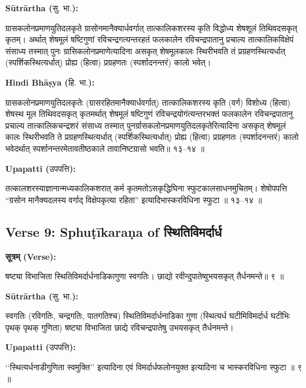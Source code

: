 \documentclass[11pt,a4paper]{article}
\newcommand{\dev}[1]{{\devanagarifont #1}}
\newcommand{\arth}{\textbf{Sūtrārtha (}\dev{सु. भा.}\textbf{):}\ }
\newcommand{\hindi}{\textbf{Hindi Bhāṣya (}\dev{हि. भा.}\textbf{):}\ }
\newcommand{\upapatti}{\textbf{Upapatti (}\dev{उपपत्ति}\textbf{):}\ }
\newenvironment{sanskritverse}{%
  \begin{center}\begin{minipage}{0.9\textwidth}
  \setlength{\leftskip}{1em}
  \setlength{\rightskip}{1em}
  \dev
}{\end{minipage}\end{center}}
\begin{document}
\noindent\arth
\begin{sanskritverse}
ग्रासकलोनप्रमाणयुतिदलकृते ग्रासोनमानैक्यार्धवर्गात् तात्कालिकशरस्य कृति विद्धोध्य
शेषशूलं तिथिवदसकृत् कृतम्। अर्थात् शेषमूलं षष्टिगुणां रविचन्द्रगत्यन्तरहतं फलकालेन
रविचन्द्रपातानु प्रचाल्य तात्कालिकविक्षेपं संसाध्य तस्मात् पुनः ग्रासिकलोनप्रमाणेत्यादिना
असकृत् शेषमूलकालः स्थिरीभवति तं प्रग्रहणस्थित्यर्धात् (स्पर्शिकस्थित्यर्धात्) प्रोह्य
(हित्वा) प्रग्रहणतः (स्पर्शादनन्तरं) कालो भवेत्।
\end{sanskritverse}

\noindent\hindi
\begin{sanskritverse}
ग्रासकलोनप्रमाणयुतिदलकृतेः (ग्रासरहितमानैक्यार्धवर्गात्) तात्कालिकशरस्य कृति
(वर्ग) विशोध्य (हित्वा) शेषस्थ मूल तिथिवदसकृत् कृतमर्थात् शेषमूलं षष्टिगुणं
रविचन्द्रयोगंत्यन्तरभक्तं फलकालेन रविचन्द्रपातानु प्रचाल्य तात्कालिकचन्द्रशरं संसाध्य
तस्मात् पुनर्ग्रासकलोनप्रमाणयुतिदलकृतेरित्यादिना असकृत् शेषमूलं कालः स्थिरीभवति
ते प्रग्रहणस्थित्यर्धात् (स्पर्शिकस्थित्यर्धात्) प्रोह्य (हित्वा) प्रग्रहणतः (स्पर्शादनन्तरं)
कालो भवेदर्थात् स्पर्शानन्तरमेतावतीष्ठकाले तावानिष्टग्रासो भवति॥ १३--१४ ॥
\end{sanskritverse}

\noindent\upapatti
\begin{sanskritverse}
तत्कालशरस्याज्ञानान्मध्यकालिकशरात् कर्म कृतमतोऽसकृद्धिघिना स्फुटकालसाधनमुचितम्।
शेषोपपत्ति ``ग्रसोन मानैक्यदलस्य वर्गाद् विक्षेपकृत्या रहिता'' इत्यादिभास्करविधिना
स्फुटा ॥ १३--१४ ॥
\end{sanskritverse}

\subsection{Verse 9: Sphuṭīkaraṇa of \dev{स्थितिविमर्दार्ध}}

\vspace{0.5em}
\noindent\textbf{\dev{सूत्रम् (Verse):}}
\begin{sanskritverse}
षष्ट्या विभाजिता स्थितिविमर्दार्धनाडिकागुणा स्वगतिः।
छाद्यो रवीन्दुपातेष्वुभयसकृत् तैर्धनमन्ते॥ ९ ॥
\end{sanskritverse}

\noindent\arth
\begin{sanskritverse}
स्वगतिः (रविगतिः, चन्द्रगतिः, पातगतिश्च) स्थितिविमर्दार्धनाडिका गुणा
(स्थित्यर्ध घटीमिविमर्दार्ध घटीभिः पृथक् पृथक् गुणिता) षष्ट्या विभाजिता छाद्ये
रविचन्द्रपातेषु उभयसकृत् तैर्धनमन्ते।
\end{sanskritverse}

\noindent\upapatti
\begin{sanskritverse}
``स्थित्यर्धनाडीगुणिता स्वमुक्ति'' इत्यादिना एवं विमर्दार्धफलोनयुक्त इत्यादिना च
भास्करविधिना स्फुटा ॥ ९ ॥
\end{sanskritverse}
\end{document}
